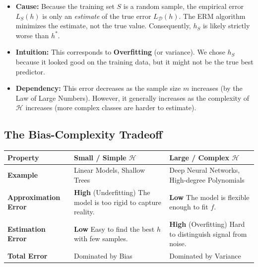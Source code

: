\documentclass[
  italian,
  11pt,
]{article}
\newcounter{none} %
\providecommand{\tightlist}{%
  \setlength{\itemsep}{0pt}\setlength{\parskip}{0pt}}
\begin{document}
\begin{itemize}
\tightlist
\item
  \textbf{Cause:} Because the training set \(S\) is a random sample, the
  empirical error \(L_S(h)\) is only an \emph{estimate} of the true
  error \(L_{\mathcal{D}}(h)\). The ERM algorithm minimizes the
  estimate, not the true value. Consequently, \(h_S\) is likely strictly
  worse than \(h^*\).
\item
  \textbf{Intuition:} This corresponds to \textbf{Overfitting} (or
  variance). We chose \(h_S\) because it looked good on the training
  data, but it might not be the true best predictor.
\item
  \textbf{Dependency:} This error decreases as the sample size \(m\)
  increases (by the Law of Large Numbers). However, it generally
  increases as the complexity of \(\mathcal{H}\) increases (more complex
  classes are harder to estimate).
\end{itemize}

\subsection{The Bias-Complexity
Tradeoff}\label{the-bias-complexity-tradeoff}

{\def\LTcaptype{none} %
\begin{longtable}[]{@{}
  >{\raggedright\arraybackslash}p{}
  >{\raggedright\arraybackslash}p{}
  >{\raggedright\arraybackslash}p{}@{}}
\toprule\noalign{}
\begin{minipage}[b]{\linewidth}\raggedright
Property
\end{minipage} & \begin{minipage}[b]{\linewidth}\raggedright
Small / Simple \(\mathcal{H}\)
\end{minipage} & \begin{minipage}[b]{\linewidth}\raggedright
Large / Complex \(\mathcal{H}\)
\end{minipage} \\
\midrule\noalign{}
\endhead
\bottomrule\noalign{}
\endlastfoot
\textbf{Example} & Linear Models, Shallow Trees & Deep Neural Networks,
High-degree Polynomials \\
\textbf{Approximation Error} & \textbf{High} (Underfitting) \newline The
model is too rigid to capture reality. & \textbf{Low} \newline The model
is flexible enough to fit \(f\). \\
\textbf{Estimation Error} & \textbf{Low} \newline Easy to find the best
\(h\) with few samples. & \textbf{High} (Overfitting) \newline Hard to
distinguish signal from noise. \\
\textbf{Total Error} & Dominated by Bias & Dominated by Variance \\
\end{longtable}
}
\end{document}
